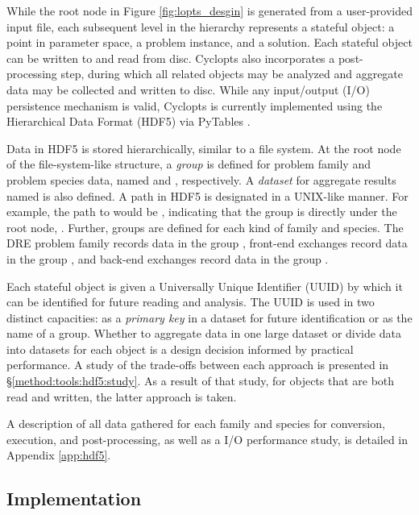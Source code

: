 While the root node in Figure \ref{fig:lopts_desgin} is generated from a
user-provided input file, each subsequent level in the hierarchy represents a
stateful object: a point in parameter space, a problem instance, and a
solution. Each stateful object can be written to and read from disc. Cyclopts
also incorporates a post-processing step, during which all related objects may
be analyzed and aggregate data may be collected and written to disc. While any
input/output (I/O) persistence mechanism is valid, Cyclopts is currently
implemented using the Hierarchical Data Format (HDF5) \cite{hdf5} via PyTables
\cite{pytables}.

Data in HDF5 is stored hierarchically, similar to a file system. At the root node
of the file-system-like structure, a \textit{group} is defined for problem family
and problem species data, named  and ,
respectively. A \textit{dataset} for aggregate results named  is
also defined. A path in HDF5 is designated in a UNIX-like manner. For example,
the path to  would be , indicating that the group is
directly under the root node, \code{/}. Further, groups are defined for each
kind of family and species. The DRE problem family records data in the group
, front-end exchanges record data in the group
, and back-end exchanges record data in the
group . 

Each stateful object is given a Universally Unique Identifier (UUID) by which it
can be identified for future reading and analysis. The UUID is used in two
distinct capacities: as a \textit{primary key} in a dataset for future
identification or as the name of a group. Whether to aggregate data in one large
dataset or divide data into datasets for each object is a design decision
informed by practical performance. A study of the trade-offs between each
approach is presented in \S \ref{method:tools:hdf5:study}. As a result of that
study, for objects that are both read and written, the latter approach is taken.

A description of all data gathered for each family and species for conversion,
execution, and post-processing, as well as a I/O performance study, is detailed
in Appendix \ref{app:hdf5}.

\subsection{Implementation}

